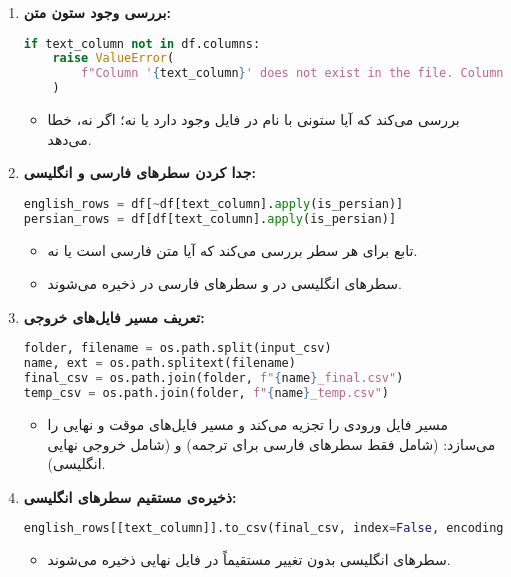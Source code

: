 \documentclass{article}
\begin{document}
\begin{enumerate}
    \item \textbf{بررسی وجود ستون متن:}
    \begin{latin}
    \begin{lstlisting}[language=Python]
if text_column not in df.columns:
    raise ValueError(
        f"Column '{text_column}' does not exist in the file. Columns: {df.columns.tolist()}"
    )
    \end{lstlisting}
    \end{latin}
    \begin{itemize}
        \item بررسی می‌کند که آیا ستونی با نام  در فایل وجود دارد یا نه؛ اگر نه، خطا می‌دهد.
    \end{itemize}

    \item \textbf{جدا کردن سطرهای فارسی و انگلیسی:}
    \begin{latin}
    \begin{lstlisting}[language=Python]
english_rows = df[~df[text_column].apply(is_persian)]
persian_rows = df[df[text_column].apply(is_persian)]
    \end{lstlisting}
    \end{latin}
    \begin{itemize}
        \item تابع  برای هر سطر بررسی می‌کند که آیا متن فارسی است یا نه.
        \item سطرهای انگلیسی در  و سطرهای فارسی در  ذخیره می‌شوند.
    \end{itemize}

    \item \textbf{تعریف مسیر فایل‌های خروجی:}
    \begin{latin}
    \begin{lstlisting}[language=Python]
folder, filename = os.path.split(input_csv)
name, ext = os.path.splitext(filename)
final_csv = os.path.join(folder, f"{name}_final.csv")
temp_csv = os.path.join(folder, f"{name}_temp.csv")
    \end{lstlisting}
    \end{latin}
    \begin{itemize}
        \item مسیر فایل ورودی را تجزیه می‌کند و مسیر فایل‌های موقت و نهایی را می‌سازد:  (شامل فقط سطرهای فارسی برای ترجمه) و  (شامل خروجی نهایی انگلیسی).
    \end{itemize}

    \item \textbf{ذخیره‌ی مستقیم سطرهای انگلیسی:}
    \begin{latin}
    \begin{lstlisting}[language=Python]
english_rows[[text_column]].to_csv(final_csv, index=False, encoding="utf-8-sig")
    \end{lstlisting}
    \end{latin}
    \begin{itemize}
        \item سطرهای انگلیسی بدون تغییر مستقیماً در فایل نهایی ذخیره می‌شوند.
    \end{itemize}


\end{enumerate}
\end{document}
